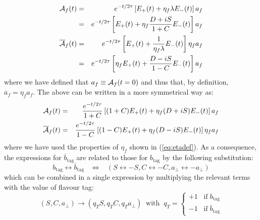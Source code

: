 \documentclass[a4paper,9pt,twoside]{article}
\begin{document}
\begin{eqnarray}
   {\cal A}_f(t)            &=& e^{-t/2\tau} \left[ E_+(t) + \eta_f \lambda E_-(t)  \right] a_f  \\
                            &=&     e^{-t/2\tau} \left[ E_+(t) +\eta_f \frac{D+iS}{1+C} E_-(t)  \right] a_f  \\
   {\overline{\cal A}}_f(t) &=& e^{-t/2\tau} \left[  E_+(t) + \frac{1}{\eta_f\lambda} E_-(t)  \right] \eta_f a_f    \\
                            &=&     e^{-t/2\tau} \left[\eta_f E_+(t) + \frac{D-iS}{1-C} E_-(t)  \right] a_f   
\end{eqnarray}
where we have defined that $a_f \equiv {\cal A}_f(t=0)$ and thus that, by definition, $\overline{a}_f = \eta_f a_f$. The above can be
written in a more symmetrical way as:
\begin{eqnarray}
   {\cal A}_f(t)           &=&     \frac{e^{-t/2\tau}}{1+C} \left[ (1+C)E_+(t) +\eta_f (D+iS) E_-(t)  \right] a_f  
\\   {\overline{\cal A}}_f(t) &=&    \frac{e^{-t/2\tau}}{1-C} \left[ (1-C)E_+(t) +\eta_f (D-iS) E_-(t)  \right] \eta_f a_f  
\end{eqnarray}
where we have used the properties of $\eta_f$ shown in (\ref{eq:etadef}).
As a consequence, the expressions for $\overline{b}_\mathrm{tag}$ are related to those for $b_\mathrm{tag}$ by the following substitution:
\begin{equation}
b_\mathrm{tag} \leftrightarrow \overline{b}_\mathrm{tag} \;\;\;\Leftrightarrow\;\;\;  ( S \leftrightarrow -S, C\leftrightarrow -C, a_\perp\leftrightarrow -a_\perp ) 
\end{equation}
which can be combined in a single expression by multiplying the relevant terms with the value of flavour tag:
\begin{equation}
(S,C,a_\perp) \rightarrow (q_T S, q_T C, q_Ta_\perp) \;\; \mathrm{with}\;\; q_T = \left\{\begin{array}{l} +1 \;\;\; \mathrm{if}\; b_\mathrm{tag} \\
                                                                                   -1 \;\;\; \mathrm{if}\; \overline{b}_\mathrm{tag}
\end{array} \right.
\end{equation}
\end{document}
